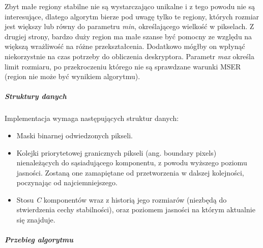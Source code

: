 Zbyt małe regiony stabilne nie są wystarczająco unikalne i z tego powodu nie są
interesujące, dlatego algorytm bierze pod uwagę tylko te regiony, których
rozmiar jest większy lub równy do parametru \textit{min}, określającego
wielkość w pikselach. Z drugiej strony, bardzo duży region ma małe szanse być
pomocny ze względu na większą wrażliwość na różne przekształcenia. Dodatkowo
mógłby on wpłynąć niekorzystnie na czas potrzeby do obliczenia deskryptora.
Parametr \textit{max} określa limit rozmiaru, po przekroczeniu którego nie są
sprawdzane warunki MSER (region nie może być wynikiem algorytmu).

\subparagraph{Struktury danych}

Implementacja wymaga następujących struktur danych: \begin{itemize} \item Maski
    binarnej odwiedzonych pikseli.  \item Kolejki priorytetowej granicznych
    pikseli (ang. boundary pixels) nienależących do sąsiadującego komponentu, z
    powodu wyższego poziomu jasności. Zostaną one zamapiętane od przetworzenia
    w dalszej kolejności, poczynając od najciemniejszego.  \item Stosu
    \textit{C} komponentów wraz z historią jego rozmiarów (niezbędą do
    stwierdzenia cechy stabilności), oraz poziomem jasności na którym aktualnie
    się znajduje.  \end{itemize}

\subparagraph{Przebieg algorytmu}

